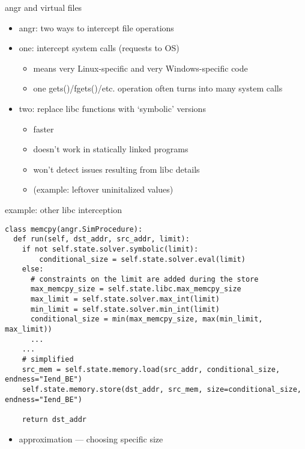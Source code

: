 \begin{frame}{angr and virtual files}
    \begin{itemize}
    \item angr: two ways to intercept file operations
    \item one: intercept system calls (requests to OS)
        \begin{itemize}
        \item means very Linux-specific and very Windows-specific code
        \item one gets()/fgets()/etc. operation often turns into many system calls
        \end{itemize}
    \item two: replace libc functions with `symbolic' versions
        \begin{itemize}
        \item faster
        \item doesn't work in statically linked programs
        \item won't detect issues resulting from libc details
        \item (example: leftover uninitalized values)
        \end{itemize}
    \end{itemize}
\end{frame}

\begin{frame}[fragile]{example: other libc interception}
\begin{Verbatim}[fontsize=\fontsize{9}{10}]
class memcpy(angr.SimProcedure):
  def run(self, dst_addr, src_addr, limit):
    if not self.state.solver.symbolic(limit):
        conditional_size = self.state.solver.eval(limit)
    else:
      # constraints on the limit are added during the store
      max_memcpy_size = self.state.libc.max_memcpy_size
      max_limit = self.state.solver.max_int(limit)
      min_limit = self.state.solver.min_int(limit)
      conditional_size = min(max_memcpy_size, max(min_limit, max_limit))
      ...
    ...
    # simplified 
    src_mem = self.state.memory.load(src_addr, conditional_size, endness="Iend_BE")
    self.state.memory.store(dst_addr, src_mem, size=conditional_size, endness="Iend_BE")

    return dst_addr
\end{Verbatim}
\begin{itemize}
\item approximation --- choosing specific size
\end{itemize}
\end{frame}

